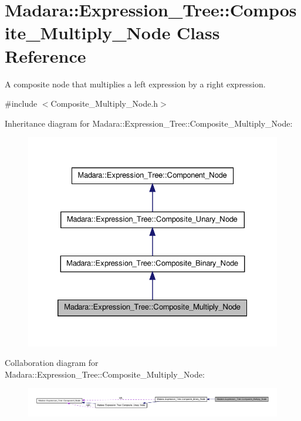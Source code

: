 \hypertarget{classMadara_1_1Expression__Tree_1_1Composite__Multiply__Node}{
\section{Madara::Expression\_\-Tree::Composite\_\-Multiply\_\-Node Class Reference}
\label{d1/daf/classMadara_1_1Expression__Tree_1_1Composite__Multiply__Node}
}


A composite node that multiplies a left expression by a right expression.  




{\ttfamily \#include $<$Composite\_\-Multiply\_\-Node.h$>$}



Inheritance diagram for Madara::Expression\_\-Tree::Composite\_\-Multiply\_\-Node:
\nopagebreak
\begin{figure}[H]
\begin{center}
\leavevmode
\includegraphics[width=328pt]{d5/d53/classMadara_1_1Expression__Tree_1_1Composite__Multiply__Node__inherit__graph}
\end{center}
\end{figure}


Collaboration diagram for Madara::Expression\_\-Tree::Composite\_\-Multiply\_\-Node:
\nopagebreak
\begin{figure}[H]
\begin{center}
\leavevmode
\includegraphics[width=400pt]{d6/d5f/classMadara_1_1Expression__Tree_1_1Composite__Multiply__Node__coll__graph}
\end{center}
\end{figure}
